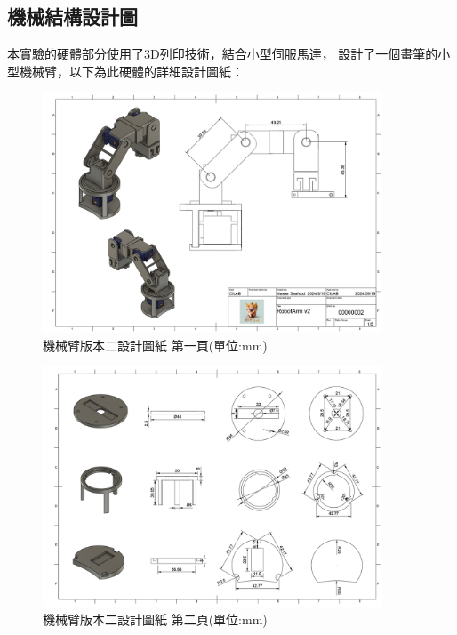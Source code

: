 \documentclass[class=NCU_thesis, crop=false]{standalone}
\begin{document}
\subsection{機械結構設計圖}
本實驗的硬體部分使用了3D列印技術，結合小型伺服馬達，
設計了一個畫筆的小型機械臂，以下為此硬體的詳細設計圖紙：
\begin{figure}[htbp]
    \centering
    \includegraphics[width=0.9\textwidth]{figures/Armv2 (1).PNG}
    \caption{機械臂版本二設計圖紙 第一頁(單位:mm)}
\end{figure}

\begin{figure}[htbp]
    \centering
    \includegraphics[width=0.9\textwidth]{figures/Armv2 (2).PNG}
    \caption{機械臂版本二設計圖紙 第二頁(單位:mm)}
\end{figure}
\end{document}
